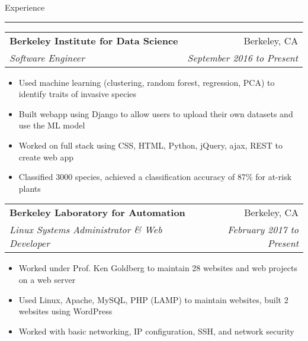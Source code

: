 \documentclass[11pt,letterpaper]{article}
\makeatletter
\newenvironment{topic}[1]
    {
    {\Large \centerline{#1}}
    \vspace*{0.03in}
    \hrule 
    \vspace*{0.05in}
    }
    {}
\newenvironment{event}
    {
    \begin{tabular*}{\textwidth}{l@{\extracolsep{\fill}}r}
    }
    {
    \end{tabular*}
    }
\makeatother
\begin{document}
    \begin{topic}{Experience}
        \begin{event}
            \textbf{Berkeley Institute for Data Science} & Berkeley, CA \\
            \emph{Software Engineer} & \emph{September 2016 to Present} \\
        \end{event}
            \begin{itemize}
                \item Used machine learning (clustering, random forest, regression, PCA) to identify traits of invasive species
                \item Built webapp using Django to allow users to upload their own datasets and use the ML model
                \item Worked on full stack using CSS, HTML, Python, jQuery, ajax, REST to create web app 
                \item Classified 3000 species, achieved a classification accuracy of 87\% for at-risk plants
            \end{itemize}
        \vspace*{0.1in}

        \begin{event}
            \textbf{Berkeley Laboratory for Automation} & Berkeley, CA \\
            \emph{Linux Systems Administrator \& Web Developer} & \emph{February 2017 to Present}
        \end{event}
            \begin{itemize}
                \item Worked under Prof. Ken Goldberg to maintain 28 websites and web projects on a web server
                \item Used Linux, Apache, MySQL, PHP (LAMP) to maintain websites, built 2 websites using WordPress
                \item Worked with basic networking, IP configuration, SSH, and network security
            \end{itemize}
        \vspace*{0.1in}


\end{topic}
\end{document}
